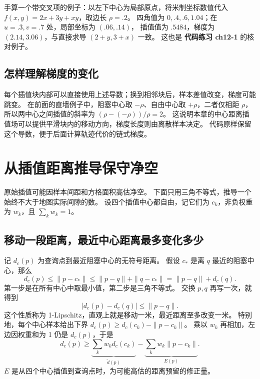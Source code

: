 \par\noindent\begin{minipage}{\linewidth}

\end{minipage}\par
手算一个带交叉项的例子：以左下中心为局部原点，将米制坐标数值代入
$f(x,y)=2x+3y+xy$，取边长 $\rho=.2$。
四角值为 $0,.4,.6,1.04$；在 $u=.3,v=.7$ 处，局部坐标为 $(.06,.14)$，
插值值为 $.5484$，梯度为 $(2.14,3.06)$，与直接求导 $(2+y,3+x)$ 一致。
这也是 \textbf{代码练习 ch12-1} 的核对例子。

\subsection{怎样理解梯度的变化}
每个插值块内部可以直接使用上述导数；换到相邻块后，样本差值改变，梯度可能跳变。
在前面的直墙例子中，阻塞中心取 $-\rho$、自由中心取 $+\rho$，二者仅相距 $\rho$，
所以两中心之间插值的斜率为 $(\rho-(-\rho))/\rho=2$。
这说明本章的中心距离插值场可以提供平滑块内的移动方向，梯度长度则由离散样本决定。
代码原样保留这个导数，便于后面计算轨迹代价的链式梯度。

\section{从插值距离推导保守净空}
原始插值可能因样本间距和方格面积高估净空。
下面只用三角不等式，推导一个始终不大于地图实际间隙的数。
设四个插值中心都自由，记它们为 $c_k$，非负权重为 $w_k$，且 $\sum_k w_k=1$。

\subsection{移动一段距离，最近中心距离最多变化多少}
记 $d_c(p)$ 为查询点到最近阻塞中心的无符号距离。
假设 $c_*$ 是离 $q$ 最近的阻塞中心，那么
\begin{equation}
d_c(p)\leq\|p-c_*\|\leq\|p-q\|+\|q-c_*\|
=\|p-q\|+d_c(q).
\end{equation}
第一步是在所有中心中取最小值，第二步是三角不等式。
交换 $p,q$ 再写一次，就得到
\begin{equation}|d_c(p)-d_c(q)|\leq\|p-q\|.\end{equation}
这个性质称为 1-Lipschitz，直观上就是移动一米，最近距离至多改变一米。
特别地，每个中心样本给出下界 $d_c(p)\geq d_c(c_k)-\|p-c_k\|$。
乘以 $w_k$ 再相加，左边因权重和为 1 仍是 $d_c(p)$，于是
\begin{equation}
d_c(p)\geq\underbrace{\sum_k w_kd_c(c_k)}_{\widetilde d(p)}
-\underbrace{\sum_k w_k\|p-c_k\|}_{E(p)}.
\end{equation}
$E$ 是从四个中心插值到查询点时，为可能高估的距离预留的修正量。

